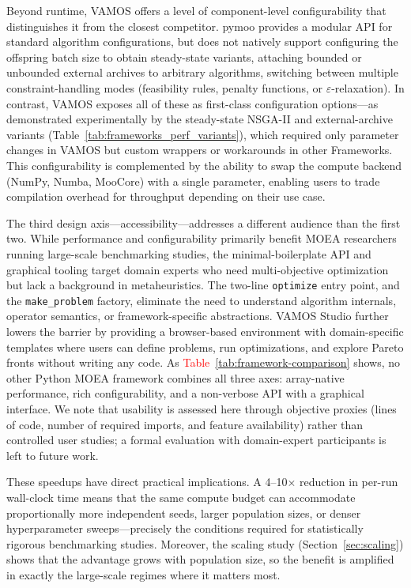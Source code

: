 \documentclass[journal]{IEEEtran}
\newcommand{\VAMOS}{VAMOS}
\begin{document}
Beyond runtime, \VAMOS{} offers a level of component-level configurability that distinguishes it from the closest competitor. pymoo provides a modular API for standard algorithm configurations, but does not natively support configuring the offspring batch size to obtain steady-state variants, attaching bounded or unbounded external archives to arbitrary algorithms, switching between multiple constraint-handling modes (feasibility rules, penalty functions, or $\varepsilon$-relaxation). In contrast, \VAMOS{} exposes all of these as first-class configuration options---as demonstrated experimentally by the steady-state NSGA-II and external-archive variants (Table~\ref{tab:frameworks_perf_variants}), which required only parameter changes in \VAMOS{} but custom wrappers or workarounds in other Frameworks. This configurability is complemented by the ability to swap the compute backend (NumPy, Numba, MooCore) with a single parameter, enabling users to trade compilation overhead for throughput depending on their use case.

The third design axis---accessibility---addresses a different audience than the first two. While performance and configurability primarily benefit MOEA researchers running large-scale benchmarking studies, the minimal-boilerplate API and graphical tooling target domain experts who need multi-objective optimization but lack a background in metaheuristics. The two-line \texttt{optimize} entry point, and the \texttt{make\_problem} factory, eliminate the need to understand algorithm internals, operator semantics, or framework-specific abstractions. VAMOS Studio further lowers the barrier by providing a browser-based environment with domain-specific templates where users can define problems, run optimizations, and explore Pareto fronts without writing any code. As \textcolor{red}{Table~\ref{tab:framework-comparison}} shows, no other Python MOEA framework combines all three axes: array-native performance, rich configurability, and a non-verbose API with a graphical interface. We note that usability is assessed here through objective proxies (lines of code, number of required imports, and feature availability) rather than controlled user studies; a formal evaluation with domain-expert participants is left to future work.

These speedups have direct practical implications. A 4--10$\times$ reduction in per-run wall-clock time means that the same compute budget can accommodate proportionally more independent seeds, larger population sizes, or denser hyperparameter sweeps---precisely the conditions required for statistically rigorous benchmarking studies. Moreover, the scaling study (Section~\ref{sec:scaling}) shows that the advantage grows with population size, so the benefit is amplified in exactly the large-scale regimes where it matters most.
\end{document}

